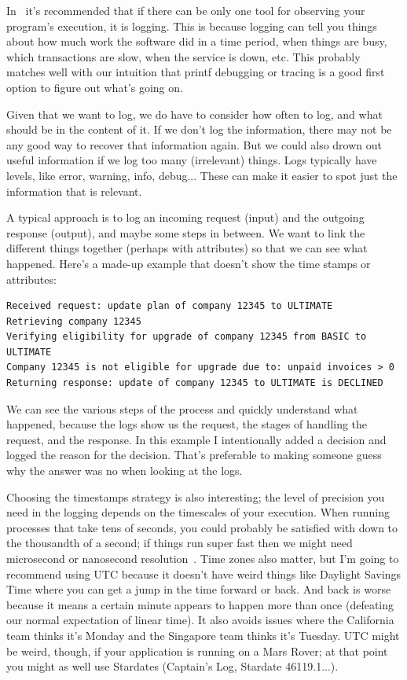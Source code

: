 \documentclass[a4paper]{report}
\begin{document}
In~\cite{usd} it's recommended that if there can be only one tool for observing your program's execution, it is logging. This is because logging can tell you things about how much work the software did in a time period, when things are busy, which transactions are slow, when the service is down, etc. This probably matches well with our intuition that printf debugging or tracing is a good first option to figure out what's going on.

Given that we want to log, we do have to consider how often to log, and what should be in the content of it. If we don't log the information, there may not be any good way to recover that information again. But we could also drown out useful information if we log too many (irrelevant) things. Logs typically have levels, like error, warning, info, debug... These can make it easier to spot just the information that is relevant.

A typical approach is to log an incoming request (input) and the outgoing response (output), and maybe some steps in between. We want to link the different things together (perhaps with attributes) so that we can see what happened. Here's a made-up example that doesn't show the time stamps or attributes:

\begin{verbatim}
Received request: update plan of company 12345 to ULTIMATE
Retrieving company 12345
Verifying eligibility for upgrade of company 12345 from BASIC to ULTIMATE
Company 12345 is not eligible for upgrade due to: unpaid invoices > 0
Returning response: update of company 12345 to ULTIMATE is DECLINED
\end{verbatim}

We can see the various steps of the process and quickly understand what happened, because the logs show us the request, the stages of handling the request, and the response. In this example I intentionally added a decision and logged the reason for the decision. That's preferable to making someone guess why the answer was no when looking at the logs.

Choosing the timestamps strategy is also interesting; the level of precision you need in the logging depends on the timescales of your execution. When running processes that take tens of seconds, you could probably be satisfied with down to the thousandth of a second; if things run super fast then we might need microsecond or nanosecond resolution~\cite{usd}. Time zones also matter, but I'm going to recommend using UTC because it doesn't have weird things like Daylight Savings Time where you can get a jump in the time forward or back. And back is worse because it means a certain minute appears to happen more than once (defeating our normal expectation of linear time). It also avoids issues where the California team thinks it's Monday and the Singapore team thinks it's Tuesday. UTC might be weird, though, if your application is running on a Mars Rover; at that point you might as well use Stardates (Captain's Log, Stardate 46119.1...).
\end{document}
